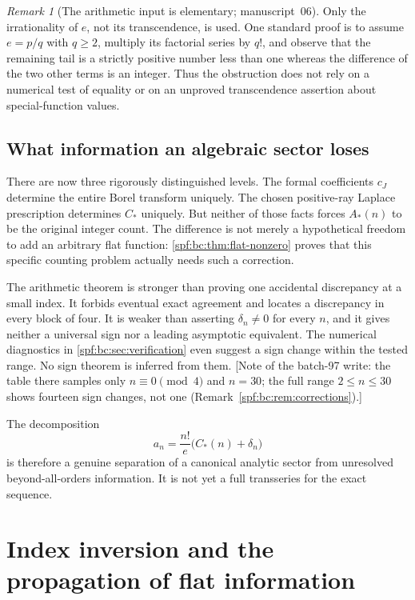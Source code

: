 \documentclass[11pt]{article}
\numberwithin{equation}{section}
\theoremstyle{definition}
\theoremstyle{remark}
\newtheorem{remark}[theorem]{Remark}
\theoremstyle{definition}
\newcommand{\bcC}{C_{\!*}}
\newcommand{\bcA}{A_{\!*}}
\begin{document}
\begin{remark}[The arithmetic input is elementary; manuscript~06]
Only the irrationality of $e$, not its transcendence, is used. One standard
proof is to assume $e=p/q$ with $q\ge2$, multiply its factorial series by
$q!$, and observe that the remaining tail is a strictly positive number less
than one whereas the difference of the two other terms is an integer.
Thus the obstruction does not rely on a numerical test of equality or on an
unproved transcendence assertion about special-function values.
\end{remark}

\subsection{What information an algebraic sector loses}

There are now three rigorously distinguished levels. The formal coefficients
$c_J$ determine the entire Borel transform uniquely. The chosen positive-ray
Laplace prescription determines $\bcC$ uniquely. But neither of those facts
forces $\bcA(n)$ to be the original integer count. The difference is not
merely a hypothetical freedom to add an arbitrary flat function:
\cref{spf:bc:thm:flat-nonzero} proves that this specific counting problem actually
needs such a correction.

The arithmetic theorem is stronger than proving one accidental discrepancy
at a small index. It forbids eventual exact agreement and locates a discrepancy
in every block of four. It is weaker than asserting $\delta_n\ne0$ for every
$n$, and it gives neither a universal sign nor a leading asymptotic equivalent.
The numerical diagnostics in \cref{spf:bc:sec:verification} even suggest a sign
change within the tested range. No sign theorem is inferred from them.
[Note of the batch-97 write: the table there samples only $n\equiv0\pmod4$
and $n=30$; the full range $2\le n\le30$ shows fourteen sign changes, not one
(Remark~\ref{spf:bc:rem:corrections}).]

The decomposition
\begin{equation}
 a_n=\frac{n!}{e}\bigl(\bcC(n)+\delta_n\bigr)
 \label{spf:bc:eq:decomposition}
\end{equation}
is therefore a genuine separation of a canonical analytic sector from
unresolved beyond-all-orders information. It is not yet a full transseries
for the exact sequence.

\section{Index inversion and the propagation of flat information}
\label{spf:bc:sec:inverse}
\end{document}
